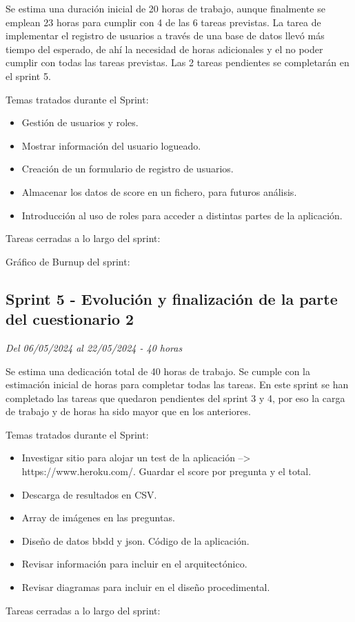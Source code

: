 Se estima una duración inicial de 20 horas de trabajo, aunque finalmente se emplean 23 horas para cumplir con 4 de las 6 tareas previstas.
La tarea de implementar el registro de usuarios a través de una base de datos llevó más tiempo del esperado, de ahí la necesidad de horas adicionales y el no poder cumplir con todas las tareas previstas.
Las 2 tareas pendientes se completarán en el sprint 5.

Temas tratados durante el Sprint:
\begin{itemize}
	\item
	Gestión de usuarios y roles.
	\item
	Mostrar información del usuario logueado.
	\item
	Creación de un formulario de registro de usuarios.
	\item
	Almacenar los datos de score en un fichero, para futuros análisis.
	\item
	Introducción al uso de roles para acceder a distintas partes de la aplicación.
\end{itemize}
\clearpage
Tareas cerradas a lo largo del sprint:

Gráfico de Burnup del sprint:


\clearpage
\subsection{Sprint 5 - Evolución y finalización de la parte del cuestionario 2}
\textit{Del 06/05/2024 al 22/05/2024 - 40 horas}

Se estima una dedicación total de 40 horas de trabajo.
Se cumple con la estimación inicial de horas para completar todas las tareas.
En este sprint se han completado las tareas que quedaron pendientes del sprint 3 y 4, por eso la carga de trabajo y de horas ha sido mayor que en los anteriores.

Temas tratados durante el Sprint:

\begin{itemize}
	\item
	Investigar sitio para alojar un test de la aplicación --> https://www.heroku.com/.
	Guardar el score por pregunta y el total.
	\item
	Descarga de resultados en CSV.
	\item
	Array de imágenes en las preguntas.
	\item
	Diseño de datos bbdd y json. Código de la aplicación.
	\item
	Revisar información para incluir en el arquitectónico.
	\item
	Revisar diagramas para incluir en el diseño procedimental.
\end{itemize}
\clearpage
Tareas cerradas a lo largo del sprint:

